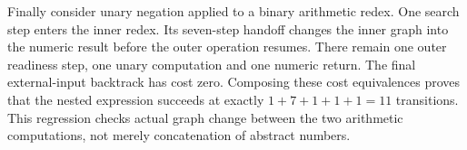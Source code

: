 
Finally consider unary negation applied to a binary arithmetic redex.
One search step enters the inner redex. Its seven-step handoff changes the
inner graph into the numeric result before the outer operation resumes.
There remain one outer readiness step, one unary computation and one numeric
return. The final external-input backtrack has cost zero. Composing these
cost equivalences proves that the nested expression succeeds at exactly
$1+7+1+1+1=11$ transitions. This regression checks actual graph change between
the two arithmetic computations, not merely concatenation of abstract numbers.

